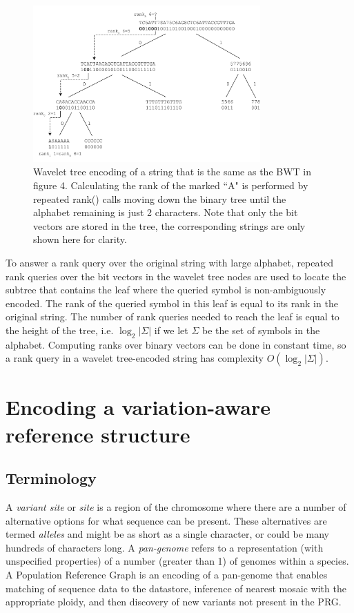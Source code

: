 \documentclass[runningheads,a4paper]{llncs}
\begin{document}
 \begin{figure}
\centering
\includegraphics[height=6cm]{wavelet_tree.png}
\caption{Wavelet tree encoding of a string that is the same as the BWT in figure 4. Calculating the rank of the marked ``A" is performed by repeated rank() calls moving down the binary tree until the alphabet remaining is just 2 characters. Note that only the bit vectors are stored in the tree, the corresponding strings are only shown here for clarity. }
\label{fig:wt}
\end{figure}

To answer a rank query over the original string with large alphabet, repeated rank queries over the bit vectors in the wavelet tree nodes are used to locate the subtree that contains the leaf where the queried symbol is non-ambiguously encoded. The rank of the queried symbol in this leaf is equal to its rank in the original string. The number of rank queries needed to reach the leaf is equal to the height of the tree, i.e. $\log_{2} {|\Sigma|}$ if we let $\Sigma$ be the set of symbols in the alphabet. Computing ranks over binary vectors can be done in constant time, so a rank query in a wavelet tree-encoded string has complexity $O(\log_{2} {|\Sigma|})$. 

\section{Encoding a variation-aware reference structure}

\subsection{Terminology}
A \textit{variant site} or \textit{site} is a region of the chromosome where there are a number of alternative options for what sequence can be present.
These alternatives are termed \textit{alleles} and might be as short as a single character, or could be many hundreds of characters long. A \textit{pan-genome} refers to a representation (with unspecified properties) of a number (greater than 1) of genomes within a species. A Population Reference Graph is an encoding of a pan-genome that enables matching of sequence data to the datastore, inference of nearest mosaic with the appropriate ploidy, and then discovery of new variants not present in the PRG. 
\end{document}
